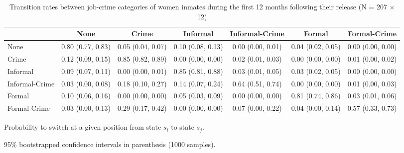 \begin{table}[htp]
\scriptsize
\setlength{\tabcolsep}{10pt}
\renewcommand{\arraystretch}{1.3}
\begin{threeparttable}
\centering
\caption{Transition rates between job-crime categories of women inmates \newline
    during the first 12 months following their release (N = 207 $\times$ 12)} 
\label{tab:transition_rates_job_crime}
\begin{tabular}{lcccccc}
  \hline
 & None & Crime & Informal & Informal-Crime & Formal & Formal-Crime \\ 
  \hline
None & 0.80 (0.77, 0.83) & 0.05 (0.04, 0.07) & 0.10 (0.08, 0.13) & 0.00 (0.00, 0.01) & 0.04 (0.02, 0.05) & 0.00 (0.00, 0.00) \\ 
  Crime & 0.12 (0.09, 0.15) & 0.85 (0.82, 0.89) & 0.00 (0.00, 0.00) & 0.02 (0.01, 0.03) & 0.00 (0.00, 0.00) & 0.01 (0.00, 0.02) \\ 
  Informal & 0.09 (0.07, 0.11) & 0.00 (0.00, 0.01) & 0.85 (0.81, 0.88) & 0.03 (0.01, 0.05) & 0.03 (0.02, 0.05) & 0.00 (0.00, 0.00) \\ 
  Informal-Crime & 0.03 (0.00, 0.08) & 0.18 (0.10, 0.27) & 0.14 (0.07, 0.24) & 0.64 (0.51, 0.74) & 0.00 (0.00, 0.00) & 0.01 (0.00, 0.03) \\ 
  Formal & 0.10 (0.06, 0.16) & 0.00 (0.00, 0.00) & 0.05 (0.03, 0.09) & 0.00 (0.00, 0.00) & 0.81 (0.74, 0.86) & 0.03 (0.01, 0.06) \\ 
  Formal-Crime & 0.03 (0.00, 0.13) & 0.29 (0.17, 0.42) & 0.00 (0.00, 0.00) & 0.07 (0.00, 0.22) & 0.04 (0.00, 0.14) & 0.57 (0.33, 0.73) \\ 
   \hline
\end{tabular}
\begin{tablenotes}
\scriptsize
\item Probability to switch at a given position from state $s_i$ to state $s_j$. 
    \item 95\% bootstrapped confidence intervals in parenthesis (1000 samples).
\end{tablenotes}
\end{threeparttable}
\end{table}
